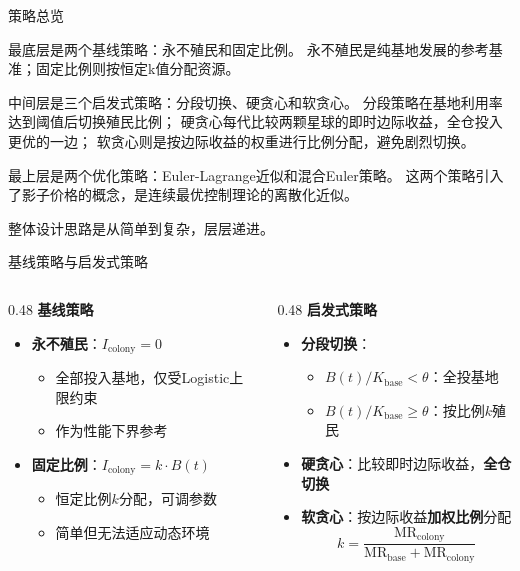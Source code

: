 \documentclass[aspectratio=169, 11pt]{beamer}
\begin{document}
\begin{frame}{策略总览}
{    最底层是两个基线策略：永不殖民和固定比例。
    永不殖民是纯基地发展的参考基准；固定比例则按恒定k值分配资源。

    中间层是三个启发式策略：分段切换、硬贪心和软贪心。
    分段策略在基地利用率达到阈值后切换殖民比例；
    硬贪心每代比较两颗星球的即时边际收益，全仓投入更优的一边；
    软贪心则是按边际收益的权重进行比例分配，避免剧烈切换。

    最上层是两个优化策略：Euler-Lagrange近似和混合Euler策略。
    这两个策略引入了影子价格的概念，是连续最优控制理论的离散化近似。

    整体设计思路是从简单到复杂，层层递进。
  }
\end{frame}

\begin{frame}{基线策略与启发式策略}
  \begin{columns}[T]
    \begin{column}{0.48\textwidth}
      \textbf{基线策略}
      \begin{itemize}
        \item \textbf{永不殖民}：$I_{\text{colony}} = 0$
        \begin{itemize}
          \item 全部投入基地，仅受Logistic上限约束
          \item 作为性能下界参考
        \end{itemize}
        \item \textbf{固定比例}：$I_{\text{colony}} = k \cdot B(t)$
        \begin{itemize}
          \item 恒定比例$k$分配，可调参数
          \item 简单但无法适应动态环境
        \end{itemize}
      \end{itemize}
    \end{column}
    \begin{column}{0.48\textwidth}
      \textbf{启发式策略}
      \begin{itemize}
        \item \textbf{分段切换}：
        \begin{itemize}
          \item $B(t)/K_{\text{base}} < \theta$：全投基地
          \item $B(t)/K_{\text{base}} \geq \theta$：按比例$k$殖民
        \end{itemize}
        \item \textbf{硬贪心}：比较即时边际收益，\textbf{全仓切换}
        \item \textbf{软贪心}：按边际收益\textbf{加权比例}分配
        \[
          k = \frac{\text{MR}_{\text{colony}}}{\text{MR}_{\text{base}} + \text{MR}_{\text{colony}}}
        \]
      \end{itemize}
    \end{column}
  \end{columns}


\end{frame}
\end{document}

